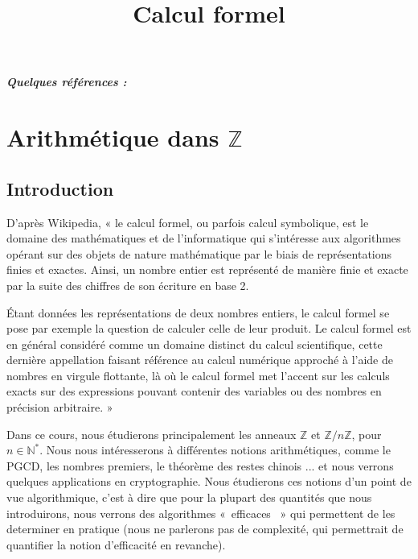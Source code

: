 \documentclass[10pt,a4paper]{report}
\title{\Huge{Calcul formel}}
\newcommand{\N}{\mathbb{N}}
\newcommand{\Z}{\mathbb{Z}}
\begin{document}
\maketitle

\tableofcontents

\paragraph{Quelques références :}




\chapter{Arithmétique dans $\mathbb{Z}$}

\section{Introduction}

D'après Wikipedia, « le calcul formel, ou parfois calcul symbolique, est le domaine des mathématiques et de l’informatique qui s’intéresse aux algorithmes opérant sur des objets de nature mathématique par le biais de représentations finies et exactes. Ainsi, un nombre entier est représenté de manière finie et exacte par la suite des chiffres de son écriture en base 2.

 Étant données les représentations de deux nombres entiers, le calcul formel se pose par exemple la question de calculer celle de leur produit.  Le calcul formel est en général considéré comme un domaine distinct du calcul scientifique, cette dernière appellation faisant référence au calcul numérique approché à l'aide de nombres en virgule flottante, là où le calcul formel met l'accent sur les calculs exacts sur des expressions pouvant contenir des variables ou des nombres en précision arbitraire. »
 
 Dans ce cours, nous étudierons principalement les anneaux $\Z$ et  $\Z/n\Z$, pour $n\in \N^*$. Nous nous intéresserons à différentes notions arithmétiques, comme le PGCD, les nombres premiers, le théorème des restes chinois ... et nous verrons quelques applications en cryptographie. Nous étudierons ces notions d'un point de vue algorithmique, c'est à dire que pour la plupart des quantités que nous introduirons,  nous verrons des algorithmes «~efficaces~ » qui permettent de les determiner en pratique (nous ne parlerons pas de complexité, qui permettrait de quantifier la notion d'efficacité en revanche).  
 
\end{document}
